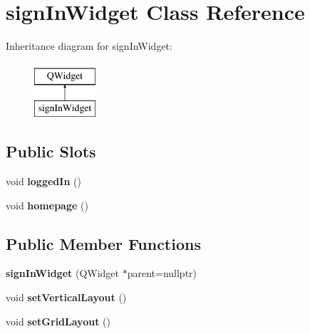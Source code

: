 \hypertarget{classsignInWidget}{\section{sign\-In\-Widget Class Reference}
\label{classsignInWidget}
}
Inheritance diagram for sign\-In\-Widget\-:\begin{figure}[H]
\begin{center}
\leavevmode
\includegraphics[height=2.000000cm]{classsignInWidget}
\end{center}
\end{figure}
\subsection*{Public Slots}
\begin{DoxyCompactItemize}
\item 
\hypertarget{classsignInWidget_a9baeda329f3f0de1a3b0daeba0829b7d}{void {\bfseries logged\-In} ()}\label{classsignInWidget_a9baeda329f3f0de1a3b0daeba0829b7d}

\item 
\hypertarget{classsignInWidget_aad9c43bc9d4305b6739e7abc8f5e7e51}{void {\bfseries homepage} ()}\label{classsignInWidget_aad9c43bc9d4305b6739e7abc8f5e7e51}

\end{DoxyCompactItemize}
\subsection*{Public Member Functions}
\begin{DoxyCompactItemize}
\item 
\hypertarget{classsignInWidget_a8af614959c9469bc1782a94a955239be}{{\bfseries sign\-In\-Widget} (Q\-Widget $\ast$parent=nullptr)}\label{classsignInWidget_a8af614959c9469bc1782a94a955239be}

\item 
\hypertarget{classsignInWidget_af93991c2a177e15727b97819e94cec30}{void {\bfseries set\-Vertical\-Layout} ()}\label{classsignInWidget_af93991c2a177e15727b97819e94cec30}

\item 
\hypertarget{classsignInWidget_af5fe3a0f9d409a8dcef869812944786c}{void {\bfseries set\-Grid\-Layout} ()}\label{classsignInWidget_af5fe3a0f9d409a8dcef869812944786c}

\end{DoxyCompactItemize}
